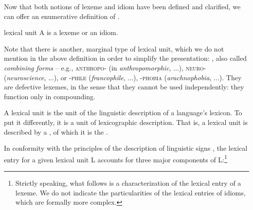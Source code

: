 Now that both notions of lexeme and idiom have been defined and clarified, we can offer an enumerative definition of .

\label{def:lexicalUnit}\begin{notiondefinition}{lexical unit}
A  is a lexeme or an idiom.
\end{notiondefinition}

Note that there is another, marginal type of lexical unit, which we do not mention in the above definition in order to simplify the presentation: , also called \textit{combining forms} \parencite{Prcic2005,Prcic2008} -- e.g., \textsc{anthropo-} (in \textit{anthropomorphic}, ...), \textsc{neuro-} (\textit{neuroscience}, ...), or \textsc{-phile} (\textit{francophile}, ...), \mbox{\textsc{-phobia}} (\textit{arachnophobia}, ...). They are defective lexemes, in the sense that they cannot be used independently: they function only in compounding.

A lexical unit is the unit of the linguistic description of a language's lexicon. To put it differently, it is a unit of lexicographic description. That is, a lexical unit is described by a , of which it is the .

In conformity with the principles of the description of linguistic signs \parencite[Ch.~11, Sec.~2]{Melcuk2013c-e}, the lexical entry for a given lexical unit L accounts for three major components of L:\footnote{Strictly speaking, what follows is a characterization of the lexical entry of a lexeme. We do not indicate the particularities of the lexical entries of idioms, which are formally more complex.}


